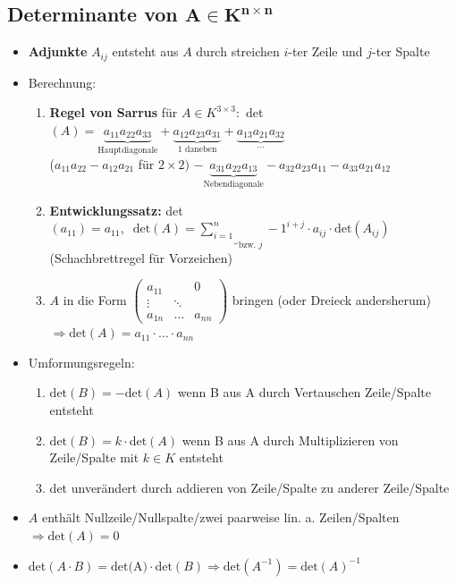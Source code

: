 \documentclass[10pt,a4paper]{article}
\begin{document}
\newpage
\subsection{Determinante von $\boldsymbol{A\in K^{n\times n}}$}
\begin{itemize}
\item \textbf{Adjunkte} $A_{ij}$ entsteht aus $A$ durch streichen $i$-ter Zeile und $j$-ter Spalte 
\item Berechnung:
\begin{enumerate}
\item \textbf{Regel von Sarrus} für $A\in K^{3\times 3}:$ det$(A)=\underbrace{a_{11}a_{22}a_{33}}_{\text{Hauptdiagonale}}+\underbrace{a_{12}a_{23}a_{31}}_{\text{1 daneben}}+\underbrace{a_{13}a_{21}a_{32}}_{\dotsc}$\\
($a_{11}a_{22}-a_{12}a_{21}$ für $2\times 2)$
\hspace{2cm} $-\underbrace{a_{31}a_{22}a_{13}}_{\text{Nebendiagonale}}-a_{32}a_{23}a_{11}-a_{33}a_{21}a_{12}$
\item \textbf{Entwicklungssatz:} det$(a_{11})=a_{11}, \;\; \text{det}(A)=\underbrace{\sum_{i=1}^{n}}_{\text{bzw. }j}-1^{i+j}\cdot a_{ij}\cdot \text{det}(A_{ij})\;$ (Schachbrettregel für Vorzeichen)
\item $A$ in die Form $\begin{pmatrix} a_{11} &&0\\ \vdots&\ddots&\\a_{1n}&\dotsc&a_{nn}\end{pmatrix}$ bringen (oder Dreieck andersherum) $\Rightarrow \text{det}(A)=a_{11}\cdot \dotsc \cdot a_{nn}$ 
\end{enumerate}
\item Umformungsregeln:
\begin{enumerate}
\item $\text{det}(B)=-\text{det}(A)$ wenn B aus A durch Vertauschen Zeile/Spalte entsteht
\item $\text{det}(B)=k\cdot \text{det}(A)$ wenn B aus A durch Multiplizieren von Zeile/Spalte mit $k\in K$ entsteht
\item det unverändert durch addieren von Zeile/Spalte zu anderer Zeile/Spalte
\end{enumerate}
\item $A$ enthält Nullzeile/Nullspalte/zwei paarweise lin. a. Zeilen/Spalten $\Rightarrow \text{det}(A)=0$
\item det$(A\cdot B)=\text{det(A)}\cdot \text{det}(B) \Rightarrow \text{det}(A^{-1})=\text{det}(A)^{-1}$
\end{itemize}
\end{document}
